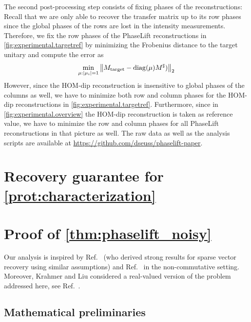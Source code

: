 The second post-processing step consists of fixing phases of the reconstructions:
Recall that we are only able to recover the transfer matrix up to its row phases since the global phases of the rows are lost in the intensity measurements.
Therefore, we fix the row phases of the PhaseLift reconstructions in \cref{fig:experimental.targetref} by minimizing the Frobenius distance to the target unitary and compute the error as
\begin{equation}
  \min_{{\mu}: {\vert\mu_i\vert} = 1}\left\|  {M}_\mathrm{target} -  \mathrm{diag} ({\mu}) {M}^\sharp) \right\|_2
\end{equation}
However, since the HOM-dip reconstruction is insensitive to global phases of the columns as well, we have to minimize both row and column phases for the HOM-dip reconstructions in \cref{fig:experimental.targetref}.
Furthermore, since in \cref{fig:experimental.overview} the HOM-dip reconstruction is taken as reference value, we have to minimize the row and column phases for all PhaseLift reconstructions in that picture as well.
The raw data as well as the analysis scripts are available at \url{https://github.com/dseuss/phaselift-paper}.


\section{Recovery guarantee for \cref{prot:characterization}}%
\label{sec:pl.guarantee}




\section{Proof of \cref{thm:phaselift_noisy}}
\label{sec:pl.main_proof}

Our analysis is inspired by Ref.~\cite{dirksen_gap_2015} (who derived strong results for sparse vector recovery using similar assumptions) and Ref.~\cite{kabanava_stable_2016} in the non-commutative setting. Moreover, Krahmer and Liu considered a real-valued version of the problem addressed here, see Ref.~\cite{krahmer_phase_2017}.




\subsection{Mathematical preliminaries}

